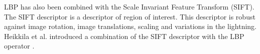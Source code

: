 \noindent  LBP has also been combined with the Scale Invariant Feature Transform (SIFT). The SIFT descriptor is a descriptor of region of interest. This descriptor is robust against image rotation, image translations, scaling and variations in the lightning. Heikkila et al. introduced a combination of the SIFT descriptor with the LBP operator \cite{HEI09}.
\newline
